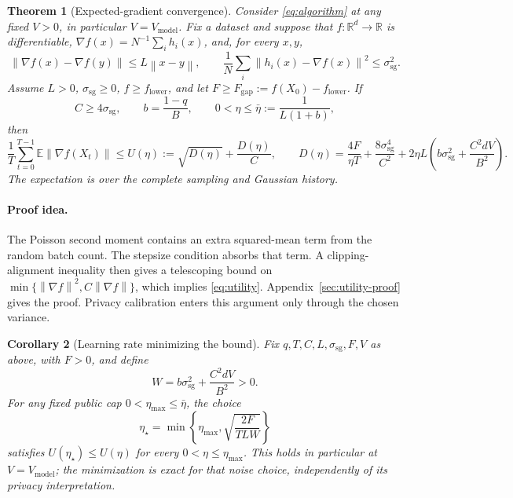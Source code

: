 \documentclass[11pt]{article}
\newtheorem{theorem}{Theorem}[section]
\newtheorem{corollary}[theorem]{Corollary}
\newcommand{\R}{\mathbb R}
\newcommand{\E}{\mathbb E}
\newcommand{\norm}[1]{\left\lVert #1\right\rVert}
\newcommand{\sg}{\mathrm{sg}}
\newcommand{\gap}{\mathrm{gap}}
\begin{document}
\begin{theorem}[Expected-gradient convergence]\label{thm:main}
Consider \eqref{eq:algorithm} at any fixed $V>0$, in particular
$V=V_{\mathrm{model}}$.
Fix a dataset and suppose that $f:\R^d\to\R$
is differentiable, $\nabla f(x)=N^{-1}\sum_i h_i(x)$, and, for every $x,y$,
\begin{equation}\label{eq:assumptions}
 \norm{\nabla f(x)-\nabla f(y)}\le L\norm{x-y},\qquad
 \frac1N\sum_i\norm{h_i(x)-\nabla f(x)}^2\le\sigma_{\sg}^2.
\end{equation}
Assume $L>0$, $\sigma_{\sg}\ge0$, $f\ge f_{\mathrm{lower}}$, and let
$F\ge F_{\gap}:=f(X_0)-f_{\mathrm{lower}}$. If
\begin{equation}\label{eq:step-domain}
 C\ge4\sigma_{\sg},\qquad
 b=\frac{1-q}{B},\qquad 0<\eta\le\bar\eta:=\frac1{L(1+b)},
\end{equation}
then
\begin{equation}\label{eq:utility}
 \frac1T\sum_{t=0}^{T-1}\E\norm{\nabla f(X_t)}
 \le U(\eta):=\sqrt{D(\eta)}+\frac{D(\eta)}C,
 \qquad
 D(\eta)=\frac{4F}{\eta T}+\frac{8\sigma_{\sg}^4}{C^2}
            +2\eta L\left(b\sigma_{\sg}^2+\frac{C^2dV}{B^2}\right).
\end{equation}
The expectation is over the complete sampling and Gaussian history.
\end{theorem}

\paragraph{Proof idea.}
The Poisson second moment contains an extra squared-mean term from the random
batch count. The stepsize condition absorbs that term. A clipping-alignment
inequality then gives a telescoping bound on
$\min\{\norm{\nabla f}^2,C\norm{\nabla f}\}$, which implies
\eqref{eq:utility}. Appendix~\ref{sec:utility-proof} gives the proof.
Privacy calibration enters this argument only through the chosen variance.

\begin{corollary}[Learning rate minimizing the bound]\label{cor:rate}
Fix $q,T,C,L,\sigma_{\sg},F,V$ as above, with $F>0$, and define
\[
 W=b\sigma_{\sg}^2+\frac{C^2dV}{B^2}>0.
\]
For any fixed public cap $0<\eta_{\max}\le\bar\eta$, the choice
\begin{equation}\label{eq:eta-star}
 \eta_\star=\min\left\{\eta_{\max},
            \sqrt{\frac{2F}{TLW}}\right\}
\end{equation}
satisfies $U(\eta_\star)\le U(\eta)$ for every $0<\eta\le\eta_{\max}$.
This holds in particular at $V=V_{\mathrm{model}}$; the minimization is
exact for that noise choice, independently of its privacy interpretation.
\end{corollary}
\end{document}
